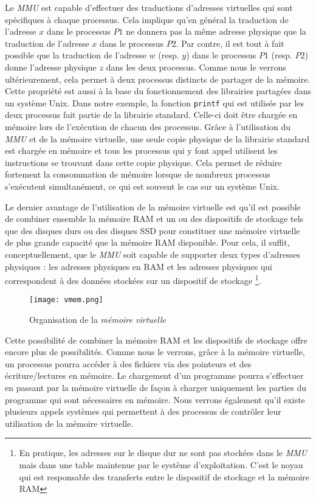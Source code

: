 Le \textit{MMU} est capable d'effectuer des traductions d'adresses
virtuelles qui sont spécifiques à chaque processus. Cela implique
qu'en général la traduction de l'adresse $x$ dans le processus $P1$
ne donnera pas la même adresse physique que la traduction de
l'adresse $x$ dans le processus $P2$. Par contre, il est tout à fait
possible que la traduction de l'adresse $w$ (resp. $y$) dans le processus
$P1$ (resp. $P2$) donne l'adresse physique $z$ dans les deux processus.
Comme nous le verrons ultérieurement,
cela permet à deux processus distincts de partager de la mémoire.
Cette propriété est aussi à la base du fonctionnement des librairies
partagées dans un système Unix. Dans notre exemple, la fonction
\verb#printf# qui est utilisée par les deux processus fait partie de la
librairie standard. Celle-ci doit être chargée en mémoire lors de
l'exécution de chacun des processus. Grâce à l'utilisation du
\textit{MMU} et de la mémoire virtuelle, une seule copie physique
de la librairie standard est chargée en mémoire et tous les processus
qui y font appel utilisent les instructions se trouvant dans cette
copie physique. Cela permet de réduire fortement la consommation de
mémoire lorsque de nombreux processus s'exécutent simultanément, ce
qui est souvent le cas sur un système Unix. \newline
   
Le dernier avantage de l'utilisation de la mémoire virtuelle est
qu'il est possible de combiner ensemble la mémoire RAM et un ou des
dispositifs de stockage tels que des disques durs ou des disques SSD
pour constituer une mémoire virtuelle de plus grande capacité que la
mémoire RAM disponible. Pour cela, il suffit, conceptuellement, que
le \textit{MMU} soit capable de supporter deux types d'adresses
physiques : les adresses physiques en RAM et les adresses physiques
qui correspondent à des données stockées sur un dispositif de
stockage \footnote{En pratique, les adresses sur le disque dur ne sont
pas stockées dans le \textit{MMU} mais dans une table maintenue par
le système d'exploitation. C'est le noyau qui est responsable des
transferts entre le dispositif de stockage et la mémoire RAM}. \newline

\begin{figure}
    \centering
    \texttt{[image: vmem.png]}
    \caption{Organisation de la \textit{mémoire virtuelle}}
\end{figure}

Cette possibilité de combiner la mémoire RAM et les dispositifs de
stockage offre encore plus de possibilités. Comme nous le verrons, grâce
à la mémoire virtuelle, un processus pourra accéder à des fichiers via
des pointeurs et des écriture/lectures en mémoire. Le chargement d'un
programme pourra s'effectuer en passant par la mémoire virtuelle de
façon à charger uniquement les parties du programme qui sont nécessaires
en mémoire. Nous verrons également qu'il existe plusieurs appels
systèmes qui permettent à des processus de contrôler leur utilisation de
la mémoire virtuelle. \newline

